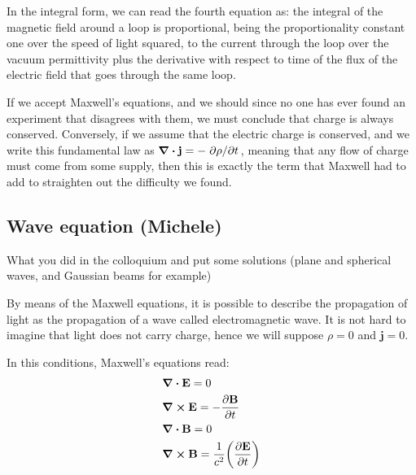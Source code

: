 \documentclass[11pt,a4paper]{article}
\begin{document}
In the integral form, we can read the fourth equation as: the integral of the magnetic field around a loop is proportional, being the proportionality constant one over the speed of light squared, to the current through the loop over the vacuum permittivity plus the derivative with respect to time of the flux of the electric field that goes through the same loop.

If we accept Maxwell's equations, and we should since no one has ever found an experiment that disagrees with them, we must conclude that charge is always conserved. Conversely, if we assume that the electric charge is conserved, and we write this fundamental law as $\div\vb{j}=-\pdv*{\rho}{t}$, meaning that any flow of charge must come from some supply, then this is exactly the term that Maxwell had to add to straighten out the difficulty we found.

\subsection{Wave equation (Michele)}
What you did in the colloquium and put some solutions (plane and spherical waves, and Gaussian beams for example)

By means of the Maxwell equations, it is possible to describe the propagation of light as the propagation of a wave called electromagnetic wave. It is not hard to imagine that light does not carry charge, hence we will suppose $\rho=0$ and $\textbf{j}=0$.

In this conditions, Maxwell's equations read:
\begin{subequations}\label{eq:maxwell_equations_wo_charge}
\begin{align}
&\div\vb{E}=0\label{eq:maxwell__wo_1}\\
&\curl\vb{E}=-\pdv{\vb{B}}{t}\label{eq:maxwell_wo_2}\\
&\div\vb{B}=0\label{eq:maxwell_wo_3}\\
&\curl\vb{B}=\frac{1}{c^2}\qty(\pdv{\vb{E}}{t})\label{eq:maxwell_wo_4}
\end{align}
\end{subequations}
\end{document}
